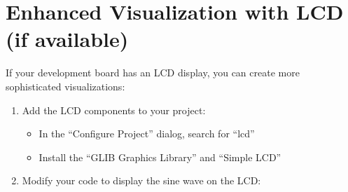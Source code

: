 \documentclass[
  9pt,
  letterpaper,
  abstract,
  titlepage]{scrbook}
\providecommand{\tightlist}{%
  \setlength{\itemsep}{0pt}\setlength{\parskip}{0pt}}\usepackage{longtable,booktabs,array}
\def\tightlist{}
\let\tightlist\relax
\begin{document}
\section{Enhanced Visualization with LCD (if
available)}\label{enhanced-visualization-with-lcd-if-available}

If your development board has an LCD display, you can create more
sophisticated visualizations:

\begin{enumerate}
\def\labelenumi{\arabic{enumi}.}
\tightlist
\item
  Add the LCD components to your project:

  \begin{itemize}
  \tightlist
  \item
    In the ``Configure Project'' dialog, search for ``lcd''
  \item
    Install the ``GLIB Graphics Library'' and ``Simple LCD''
  \end{itemize}
\item
  Modify your code to display the sine wave on the LCD:
\end{enumerate}
\end{document}
